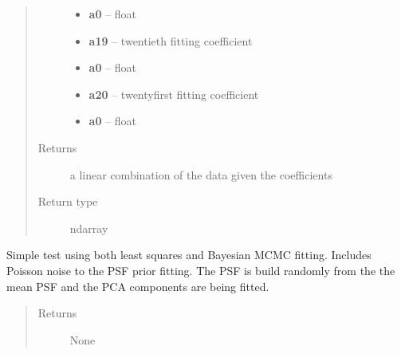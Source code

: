 \documentclass[a4paper,12pt,english]{sphinxmanual}
\begin{document}
\begin{fulllineitems}
\begin{quote}
\begin{description}
\begin{itemize}
\item {} 
\textbf{a0} -- float

\item {} 
\textbf{a19} -- twentieth fitting coefficient

\item {} 
\textbf{a0} -- float

\item {} 
\textbf{a20} -- twentyfirst fitting coefficient

\item {} 
\textbf{a0} -- float

\end{itemize}

\item[{Returns}] \leavevmode
a linear combination of the data given the coefficients

\item[{Return type}] \leavevmode
ndarray

\end{description}\end{quote}

\end{fulllineitems}


\begin{fulllineitems}
\label{analysis:analysis.fitPSF.test}
Simple test using both least squares and Bayesian MCMC fitting.
Includes Poisson noise to the PSF prior fitting. The PSF is build randomly
from the the mean PSF and the PCA components are being fitted.
\begin{quote}\begin{description}
\item[{Returns}] \leavevmode
None

\end{description}\end{quote}

\end{fulllineitems}

\end{document}
